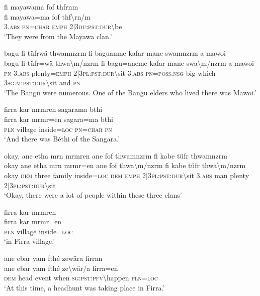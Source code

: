 \ea\label{ex:4:a1649}
fi mayawama fof thfrnm\\
\gll fi	mayawa=ma	fof	thf{\textbackslash}rn/m\\
     3.\textsc{abs}	\textsc{pn}=\textsc{char}	\textsc{emph}	2|3\textsc{du}:\textsc{pst}:\textsc{dur}{\textbackslash}be\\
\glt `They were from the Mayawa clan.'
\z

\newpage
\ea\label{ex:4:a1650}
bagu fi tüfrwä thwamnzrm fi baguanme kafar mane swamnzrm a mawoi\\
\gll bagu	fi	tüfr=wä	thwa{\textbackslash}m/nzrm	fi	bagu=aneme	kafar	mane	swa{\textbackslash}m/nzrm	a	mawoi\\
     \textsc{pn}	3.\textsc{abs}	plenty=\textsc{emph}	2|3\textsc{pl}:\textsc{pst}:\textsc{dur}{\textbackslash}sit	3.\textsc{abs}	\textsc{pn}=\textsc{poss}.\textsc{nsg}	big	which	3\textsc{sg}.\textsc{m}:\textsc{pst}:\textsc{dur}{\textbackslash}sit	and	\textsc{pn}\\
\glt `The Bangu were numerous. One of the Bangu elders who lived there was Mawoi.'
\z

\ea\label{ex:4:a1653}
firra kar mrmren sagarama bthi\\
\gll firra	kar	mrmr=en	sagara=ma	bthi\\
     \textsc{pln}	village	inside=\textsc{loc}	\textsc{pn}=\textsc{char}	\textsc{pn}\\
\glt `And there was Béthi of the Sangara.'
\z

\ea\label{ex:4:a1656}
okay, ane etha mrn mrmren ane fof thwamnzrm fi kabe tüfr thwamnzrm\\
\gll okay	ane	etha	mrn	mrmr=en	ane	fof	thwa{\textbackslash}m/nzrm	fi	kabe	tüfr	thwa{\textbackslash}m/nzrm\\
     okay	\textsc{dem}	three	family	inside=\textsc{loc}	\textsc{dem}	\textsc{emph}	2|3\textsc{pl}:\textsc{pst}:\textsc{dur}{\textbackslash}sit	3.\textsc{abs}	man	plenty	2|3\textsc{pl}:\textsc{pst}:\textsc{dur}{\textbackslash}sit\\
\glt `Okay, there were a lot of people within these three clans'
\z

\ea\label{ex:4:a1657}
firra kar mrmren\\
\gll firra	kar	mrmr=en\\
     \textsc{pln}	village	inside=\textsc{loc}\\
\glt `in Firra village.'
\z

\ea\label{ex:4:a1658}
ane ebar yam fthé zewära firran\\
\gll ane	ebar	yam	fthé	ze{\textbackslash}wär/a	firra=en\\
     \textsc{dem}	head	event	when	\textsc{sg}:\textsc{pst}:\textsc{pfv}{\textbackslash}happen	\textsc{pln}=\textsc{loc}\\
\glt `At this time, a headhunt was taking place in Firra.'
\z

